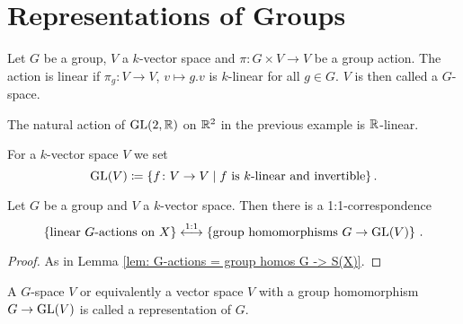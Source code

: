 \section{Representations of Groups}


\begin{defi}
  Let $G$ be a group, $V$ a $k$-vector space and $\pi \colon G \times V \to V$ be a group action.
  The action is linear if $\pi_g \colon V \to V$, $v \mapsto g.v$ is $k$-linear for all $g \in G$.
  $V$ is then called a $G$-space.
\end{defi}


\begin{expl}
  The natural action of $\operatorname{GL}(2,\mathbb{R})$ on $\mathbb{R}^2$ in the previous example is $\mathbb{R}$-linear.
\end{expl}


For a $k$-vector space $V$ we set
\[
            \operatorname{GL}(V)
  \coloneqq \{
              f \colon V \to V
            \mid
              f \text{ is $k$-linear and invertible}
            \} \,.
\]


\begin{lem}
  Let $G$ be a group and $V$ a $k$-vector space.
  Then there is a 1:1-correspondence
  \[
    \left\{
      \text{linear $G$-actions on $X$}
    \right\}
    \overset{1:1}{\longleftrightarrow}
    \left\{
      \text{group homomorphisms $G \to \operatorname{GL}(V)$}
    \right\} \,.
  \]
\end{lem}
\begin{proof}
  As in Lemma \ref{lem: G-actions = group homos G -> S(X)}.
\end{proof}


\begin{rem}
  A $G$-space $V$ or equivalently a vector space $V$ with a group homomorphism $G \to \operatorname{GL}(V)$ is called a representation of $G$.
\end{rem}


